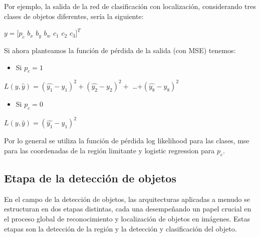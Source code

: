 	Por ejemplo, la salida de la red de clasificación con localización, considerando tres clases de objetos diferentes, sería la siguiente:
	
	\begin{center}
		\large{$y = [p_c$ $b_x$ $b_y$ $b_w$ $c_1$ $c_2$ $c_3]^T$}
	\end{center}
	
	Si ahora planteamos la función de pérdida de la salida (con MSE) tenemos:
	\vspace{0.3cm}
	\begin{itemize}[left=2cm]
	
	\item Si $p_c=1$
	\end{itemize}
	
	\begin{center}
		\large{$L(y,\hat{y}) = (\hat{y_1}-y_1)^2 + (\hat{y_2}-y_2)^2 +$ \dots $+ (\hat{y_8}-y_8)^2$}
	\end{center}	
		
	\begin{itemize}[left=2cm]
	\item Si $p_c=0$
	\end{itemize}
	
	\begin{center}
		\large{$L(y,\hat{y}) = (\hat{y_1}-y_1)^2$}
	\end{center}
	\pagebreak
	Por lo general se utiliza la función de pérdida log likelihood para las clases, mse para las coordenadas de la región limitante y logistic regression para $p_c$.

	\subsection{Etapa de la detección de objetos}
	En el campo de la detección de objetos, las arquitecturas aplicadas a menudo se estructuran en dos etapas distintas, cada una desempeñando un papel crucial en el proceso global de reconocimiento y localización de objetos en imágenes. Estas etapas son la detección de la región y la detección y clasificación del objeto.


